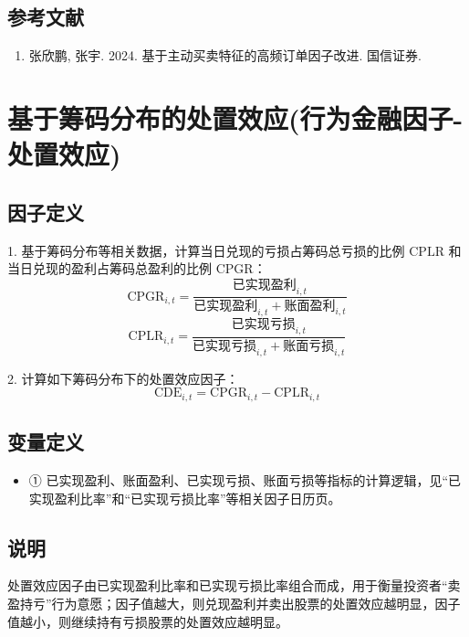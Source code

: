 \documentclass{article}
\begin{document}
\subsection{参考文献}
\begin{enumerate}
    \item 张欣鹏, 张宇. 2024. 基于主动买卖特征的高频订单因子改进. 国信证券.
\end{enumerate}

\section{基于筹码分布的处置效应(行为金融因子-处置效应)}

\subsection{因子定义}

1. 基于筹码分布等相关数据，计算当日兑现的亏损占筹码总亏损的比例 \( \mathrm{CPLR} \) 和当日兑现的盈利占筹码总盈利的比例 \( \mathrm{CPGR} \)：
\begin{equation}
    \mathrm{CPGR}_{i,t} = \frac{\text{已实现盈利}_{i,t}}{\text{已实现盈利}_{i,t} + \text{账面盈利}_{i,t}}
\end{equation}
\begin{equation}
    \mathrm{CPLR}_{i,t} = \frac{\text{已实现亏损}_{i,t}}{\text{已实现亏损}_{i,t} + \text{账面亏损}_{i,t}}
\end{equation}

2. 计算如下筹码分布下的处置效应因子：
\begin{equation}
    \mathrm{CDE}_{i,t} = \mathrm{CPGR}_{i,t} - \mathrm{CPLR}_{i,t}
\end{equation}

\subsection{变量定义}
\begin{itemize}
    \item ① 已实现盈利、账面盈利、已实现亏损、账面亏损等指标的计算逻辑，见“已实现盈利比率”和“已实现亏损比率”等相关因子日历页。
\end{itemize}

\subsection{说明}
处置效应因子由已实现盈利比率和已实现亏损比率组合而成，用于衡量投资者“卖盈持亏”行为意愿；因子值越大，则兑现盈利并卖出股票的处置效应越明显，因子值越小，则继续持有亏损股票的处置效应越明显。
\end{document}
